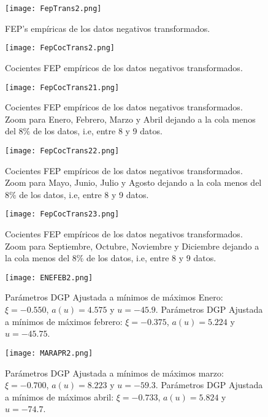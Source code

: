 \documentclass[10.5pt,notitlepage]{article}
\theoremstyle{plain}
\begin{document}
\begin{figure}[htb]
    \centering
    \texttt{[image: FepTrans2.png]}
    \caption{FEP's empíricas de los datos negativos transformados.}
    \label{fig:2/5}
\end{figure}

\begin{figure}[htb]
    \centering
    \texttt{[image: FepCocTrans2.png]}
    \caption{Cocientes FEP empíricos de los datos negativos transformados.}
    \label{fig:2/6}
\end{figure}

\begin{figure}[htb]
    \centering
    \texttt{[image: FepCocTrans21.png]}
    \caption{Cocientes FEP empíricos de los datos negativos transformados. Zoom para Enero, Febrero, Marzo y Abril dejando a la cola menos del \(8\%\) de los datos, i.e, entre 8 y 9 datos.}
    \label{fig:2/6.1}
\end{figure}

\begin{figure}[htb]
    \centering
    \texttt{[image: FepCocTrans22.png]}
    \caption{Cocientes FEP empíricos de los datos negativos transformados. Zoom para Mayo, Junio, Julio y Agosto dejando a la cola menos del \(8\%\) de los datos, i.e, entre 8 y 9 datos.}
    \label{fig:2/6.2}
\end{figure}

\begin{figure}[htb]
    \centering
    \texttt{[image: FepCocTrans23.png]}
    \caption{Cocientes FEP empíricos de los datos negativos transformados. Zoom para Septiembre, Octubre, Noviembre y Diciembre dejando a la cola menos del \(8\%\) de los datos, i.e, entre 8 y 9 datos.}
    \label{fig:2/6.3}
\end{figure}

\begin{figure}[htb]
    \centering
    \texttt{[image: ENEFEB2.png]}
    \caption{Parámetros DGP Ajustada a mínimos de máximos Enero: \(\xi = -0.550\), \(a(u)=4.575\) y \(u = -45.9\). Parámetros DGP Ajustada a mínimos de máximos febrero: \(\xi =-0.375\), \(a(u)=5.224\) y \(u= -45.75\).}
    \label{fig:2/7}
\end{figure}  


\begin{figure}[htb]
    \centering
    \texttt{[image: MARAPR2.png]}
    \caption{Parámetros DGP Ajustada a mínimos de máximos marzo: \(\xi =  -0.700\), \(a(u)=8.223\) y \(u = -59.3\). Parámetros DGP Ajustada a mínimos de máximos abril: \(\xi =  -0.733\), \(a(u)=  5.824\) y \(u = -74.7\).}
    \label{fig:2/8}
\end{figure} 
\end{document}
